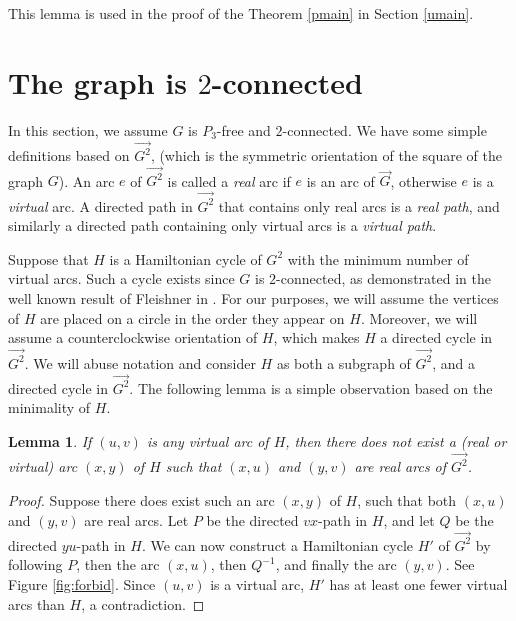 \documentclass[12pt,letterpaper,oneside]{book}
\newtheorem{lemma}[theorem]{Lemma}
\begin{document}
This lemma is used in the proof of the Theorem \ref{pmain} in Section \ref{umain}.  


\newpage
\section{The graph is $2$-connected}
\label{sec:twocon}

In this section, we assume $G$ is $P_3$-free and $2$-connected.  
We have some simple definitions based on $\vec{G^2}$, (which is the symmetric orientation of the square of the graph $G$).  
An arc $e$ of $\vec{G^2}$ is called a \emph{real} arc if $e$ is 
an arc of $\vec{G}$, otherwise $e$ is a \emph{virtual} arc.  
A directed path in $\vec{G^2}$ that contains only real arcs is a \emph{real path},  
and similarly a directed path containing only virtual arcs is a \emph{virtual path}. 
 

Suppose that $H$ is a Hamiltonian cycle of $G^2$ with the minimum number of virtual arcs.  Such a cycle exists 
since $G$ is $2$-connected, as demonstrated in the well known result of Fleishner in \cite{FL}.  
For our  
purposes, we will assume the vertices of $H$ are placed on a circle in the order they appear on $H$.  Moreover, we will assume  
a counterclockwise orientation of $H$, which makes $H$ a directed cycle in $\vec{G^2}$.  
We will abuse notation and consider $H$ as both a subgraph of $\vec{G^2}$, and a directed cycle in $\vec{G^2}$.  
The following lemma is a simple observation based on the minimality of $H$.  

  
\begin{lemma}\label{obsx} If $(u,v)$ is any virtual arc of $H$, then there does not exist a (real or virtual) 
arc $(x,y)$ of $H$ such that $(x,u)$ and $(y,v)$ are real arcs of $\vec{G^2}$. 
\end{lemma} 
\begin{proof} 
Suppose there does exist such an arc $(x,y)$ of $H$, such that 
both $(x,u)$ and $(y,v)$ are real arcs.  Let $P$ be the directed $vx$-path in $H$,  
and let $Q$ be the directed 
$yu$-path in $H$.  We can now construct a Hamiltonian cycle $H'$ of $\vec{G^2}$ by following $P$, then the arc $(x,u)$,  
then $Q^{-1}$, and finally the arc $(y,v)$.  See Figure \ref{fig:forbid}.  
Since $(u,v)$ is a virtual arc, $H'$ has at least one fewer virtual arcs than $H$,  
a contradiction. 

\end{proof} 
\end{document}
